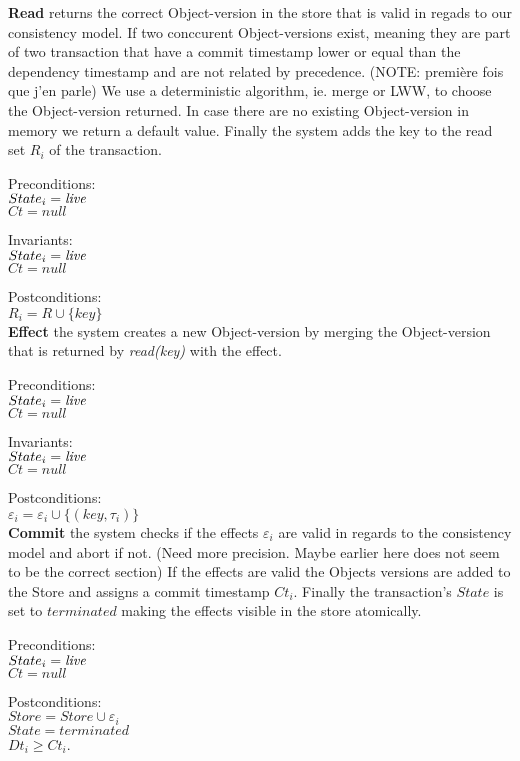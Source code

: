 \documentclass[systeme,french,english]{compas2022}
\begin{document}
\textbf{Read} returns the correct Object-version in the store that is valid in regads to our consistency model.
If two conccurent Object-versions exist, meaning they are part of two transaction that have a commit timestamp lower or equal than the dependency timestamp and are not related by precedence.
(NOTE: première fois que j'en parle)
We use a deterministic algorithm, ie. merge or LWW, to choose the Object-version returned.
In case there are no existing Object-version in memory we return a default value.
Finally the system adds the key to the read set $R_i$ of the transaction. 

Preconditions:\\ 
$State_i = \emph{live}$ \\
$Ct = null$

Invariants:\\
$State_i = \emph{live}$ \\
$Ct = null$

Postconditions:\\
$R_i = R \cup \{key\}$ \\

\textbf{Effect} the system creates a new Object-version by merging the Object-version that is returned by \emph{read(key)} with the effect.

Preconditions:\\ 
$State_i = \emph{live}$ \\
$Ct = null$

Invariants:\\
$State_i = \emph{live}$ \\
$Ct = null$

Postconditions:\\
$\varepsilon_i = \varepsilon_i \cup \{(key, \tau_i)\}$ \\

\textbf{Commit} the system checks if the effects $\varepsilon_i$ are valid in regards to the consistency model and abort if not. (Need more precision. Maybe earlier here does not seem to be the correct section)
If the effects are valid the Objects versions are added to the Store and assigns a commit timestamp $Ct_i$.
Finally the transaction's $State$ is set to $terminated$ making the effects visible in the store atomically.

Preconditions:\\ 
$State_i = \emph{live}$ \\
$Ct = null$

Postconditions:\\
$Store = Store \cup \varepsilon_i$\\
$State = terminated$\\
$Dt_i \geq Ct_i$.\\
\end{document}
